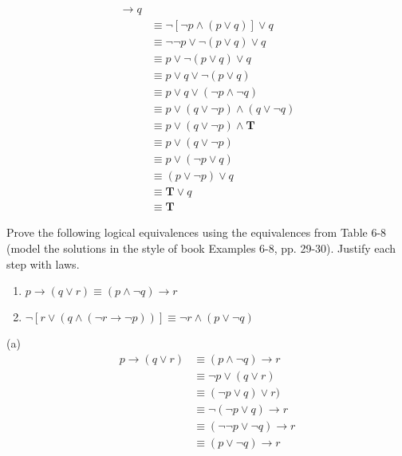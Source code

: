 \documentclass[12pt,addpoints]{exam}
\newcommand{\ra}{\rightarrow}
\begin{document}
\begin{questions}
\begin{solution}
    \begin{align*}
        [ \neg p & \wedge (p \vee q) ] \ra q \\
        & \equiv \neg [ \neg p \wedge (p \vee q) ] \vee q \tag{Table 7, rule 1} \\
        & \equiv \neg \neg p \vee \neg (p \vee q) \vee q \tag{DeMorgan's law} \\
        & \equiv p \vee \neg (p \vee q) \vee q \tag{Double Negation} \\
        & \equiv p \vee q \vee \neg (p \vee q) \tag{Commutative} \\
        & \equiv p \vee q \vee (\neg p \wedge \neg q) \tag{DeMorgan's} \\
        & \equiv p \vee (q \vee \neg p) \wedge (q \vee \neg q) \tag{Distributive} \\
        & \equiv p \vee (q \vee \neg p) \wedge \mathbf{T} \tag{Negation} \\
        & \equiv p \vee (q \vee \neg p) \tag{Identity} \\
        & \equiv p \vee (\neg p \vee q) \tag{Commutative} \\
        & \equiv (p \vee \neg p) \vee q \tag{Associative} \\
        & \equiv \mathbf{T} \vee q \tag{Negation} \\
        & \equiv \mathbf{T} \tag{Domination}
    \end{align*}
\end{solution}

\question[16] Prove the following logical equivalences using the
equivalences from Table 6-8 (model the solutions in the style of
book Examples 6-8, pp. 29-30).  Justify each step with laws.
\begin{enumerate}[label=(\alph*),itemsep=0pt,parsep=0pt,topsep=0pt,partopsep=0pt]
    \item $p \ra (q \vee r) \equiv (p \wedge \neg q) \ra r$
    \item $\neg [ r \vee (q \wedge (\neg r \ra \neg p))] \equiv \neg r \wedge (p \vee \neg q) $
\end{enumerate}
    \begin{solution}
    
    (a)
    \begin{align*}
        p \ra (q \vee r) &\equiv (p \wedge \neg q) \ra r \\
            & \equiv \neg p \vee (q \vee r) \tag{Table 7, rule 1} \\
            & \equiv (\neg p \vee q) \vee r) \tag{Associative} \\
            & \equiv \neg (\neg p \vee q) \ra r \tag{Table 7, rule 1} \\
            & \equiv (\neg \neg p \vee \neg q) \ra r \tag{DeMorgan's} \\
            & \equiv (p \vee \neg q) \ra r \tag{Double Negation} 
    \end{align*}
    

\end{solution}
\end{questions}
\end{document}

